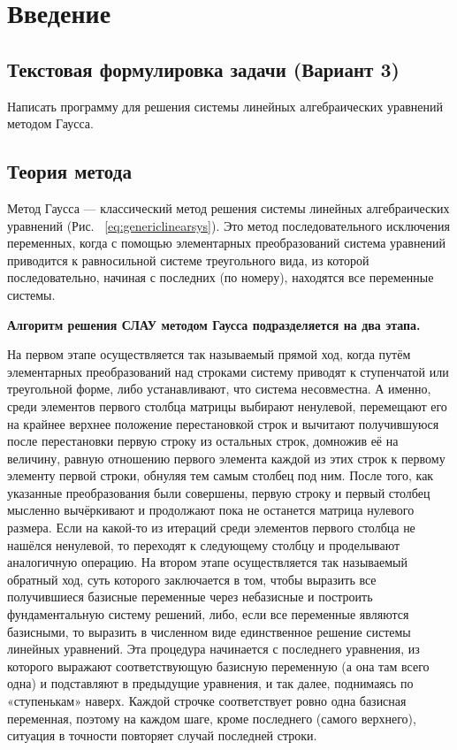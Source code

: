 \documentclass[12pt,a4paper]{scrartcl}
\begin{document}
\section{Введение}
\label{sec:intro}
\subsection{Текстовая формулировка задачи (Вариант 3)}
	Написать программу для решения системы линейных алгебраических уравнений методом Гаусса.
	
 \subsection{Теория метода}

Метод Гаусса — классический метод решения системы линейных алгебраических уравнений (Рис. ~\ref{eq:genericlinearsys}). Это метод последовательного исключения переменных, когда с помощью элементарных преобразований система уравнений приводится к равносильной системе треугольного вида, из которой последовательно, начиная с последних (по номеру), находятся все переменные системы.
	
\textbf{Алгоритм решения СЛАУ методом Гаусса подразделяется на два этапа.}	

На первом этапе осуществляется так называемый прямой ход, когда путём элементарных преобразований над строками систему приводят к ступенчатой или треугольной форме, либо устанавливают, что система несовместна. А именно, среди элементов первого столбца матрицы выбирают ненулевой, перемещают его на крайнее верхнее положение перестановкой строк и вычитают получившуюся после перестановки первую строку из остальных строк, домножив её на величину, равную отношению первого элемента каждой из этих строк к первому элементу первой строки, обнуляя тем самым столбец под ним. После того, как указанные преобразования были совершены, первую строку и первый столбец мысленно вычёркивают и продолжают пока не останется матрица нулевого размера. Если на какой-то из итераций среди элементов первого столбца не нашёлся ненулевой, то переходят к следующему столбцу и проделывают аналогичную операцию.
На втором этапе осуществляется так называемый обратный ход, суть которого заключается в том, чтобы выразить все получившиеся базисные переменные через небазисные и построить фундаментальную систему решений, либо, если все переменные являются базисными, то выразить в численном виде единственное решение системы линейных уравнений. Эта процедура начинается с последнего уравнения, из которого выражают соответствующую базисную переменную (а она там всего одна) и подставляют в предыдущие уравнения, и так далее, поднимаясь по «ступенькам» наверх. Каждой строчке соответствует ровно одна базисная переменная, поэтому на каждом шаге, кроме последнего (самого верхнего), ситуация в точности повторяет случай последней строки.
		
\end{document}
